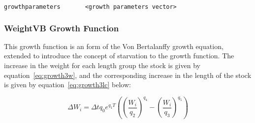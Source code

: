 \documentclass [a4paper, 10pt]{book}
\begin{document}
{\small\begin{verbatim}
growthparameters       <growth parameters vector>
\end{verbatim}}

%
%
%

\subsubsection{WeightVB Growth Function}\label{subsec:growth3}
This growth function is an form of the Von Bertalanffy growth equation, extended to introduce the concept of starvation to the growth function.  The increase in the weight for each length group the stock is given by equation~\ref{eq:growth3w}, and the corresponding increase in the length of the stock is given by equation~\ref{eq:growth3lc} below:

\begin{equation}\label{eq:growth3w}
\Delta W_{i} = \Delta t q_{0} e^{q_{1} T}\left(
\left( \frac{W_{i}}{q_{2}} \right)^{q_{4}} -
\left( \frac{W_{i}}{q_{3}} \right)^{q_{5}} \right)
\end{equation}
\end{document}
